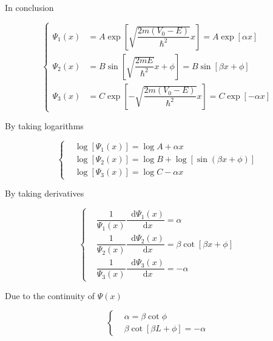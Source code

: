 \documentclass{article}
\newcommand*{\md}{\mathop{}\!\mathrm{d}}
\begin{document}
In conclusion

\begin{equation*}
  \left\{
  \begin{aligned}
    \Psi_1 \left( x \right) &= A \exp \left[ \sqrt{\dfrac{2 m \left( V_0 - E \right)}{\hbar^2} } x \right] = A \exp \left[ \alpha x \right] \\
    \Psi_2 \left( x \right) &= B \sin \left[ \sqrt{\dfrac{2 m E}{\hbar^2} } x + \phi \right] = B \sin \left[ \beta x + \phi \right] \\
    \Psi_3 \left( x \right) &= C \exp \left[ - \sqrt{\dfrac{2 m \left( V_0 - E \right)}{\hbar^2} } x \right] = C \exp \left[ - \alpha x \right]
  \end{aligned}
  \right.
\end{equation*}

By taking logarithms

\begin{equation*}
  \left\{
  \begin{aligned}
    & \log \left[ \Psi_1 \left( x \right) \right] =  \log A + \alpha x \\
    & \log \left[ \Psi_2 \left( x \right) \right]  = \log B  + \log \left[ \sin \left( \beta x + \phi \right) \right] \\
    & \log \left[ \Psi_3 \left( x \right) \right] = \log C - \alpha x
  \end{aligned}
  \right.
\end{equation*}

By taking derivatives

\begin{equation*}
  \left\{
  \begin{aligned}
    & \dfrac{1}{\Psi_1 \left( x \right)} \dfrac{\md \Psi_1 \left( x \right)}{\md x} = \alpha \\
    & \dfrac{1}{\Psi_2 \left( x \right)} \dfrac{\md \Psi_2 \left( x \right)}{\md x} = \beta \cot \left[ \beta x + \phi \right] \\
    & \dfrac{1}{\Psi_3 \left( x \right)} \dfrac{\md \Psi_3 \left( x \right)}{\md x} = - \alpha
  \end{aligned}
  \right.
\end{equation*}

Due to the continuity of $\Psi \left( x \right)$

\begin{equation*}
  \left\{
  \begin{aligned}
    & \alpha = \beta \cot \phi \\
    & \beta \cot \left[ \beta L + \phi \right] = - \alpha
  \end{aligned}
  \right.
\end{equation*}
\end{document}
